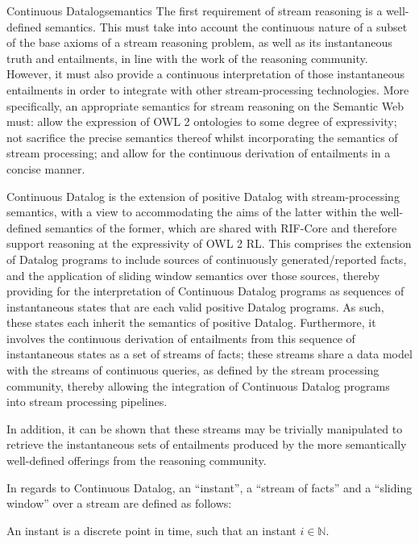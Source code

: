 \begin{nestedsection}{Continuous Datalog}{semantics}
The first requirement of stream reasoning is a well-defined semantics.
This must take into account the continuous nature of a subset of the
base axioms of a stream reasoning problem, as well as its
instantaneous truth and entailments, in line with the work of the
reasoning community.  However, it must also provide a continuous
interpretation of those instantaneous entailments in order to
integrate with other stream-processing technologies.  More
specifically, an appropriate semantics for stream reasoning on the
Semantic Web must: allow the expression of OWL 2 ontologies to some
degree of expressivity; not sacrifice the precise semantics thereof
whilst incorporating the semantics of stream processing; and allow for
the continuous derivation of entailments in a concise manner.

	Continuous Datalog is the extension of positive Datalog with stream-processing semantics, with a view to accommodating the aims of the latter within the well-defined semantics of the former, which are shared with RIF-Core and therefore support reasoning at the expressivity of OWL 2 RL.
	This comprises the extension of Datalog programs to include sources of continuously generated/reported facts, and the application of sliding window semantics over those sources, thereby providing for the interpretation of Continuous Datalog programs as sequences of instantaneous states that are each valid positive Datalog programs.
	As such, these states each inherit the semantics of positive Datalog.
	Furthermore, it involves the continuous derivation of entailments from this sequence of instantaneous states as a set of streams of facts;
	these streams share a data model with the streams of continuous queries, as defined by the stream processing community, thereby allowing the integration of Continuous Datalog programs into stream processing pipelines.

In addition, it can be shown that these streams may be trivially
manipulated to retrieve the instantaneous sets of entailments produced
by the more semantically well-defined offerings from the reasoning
community.

	In regards to Continuous Datalog, an ``instant'', a ``stream of facts'' and a ``sliding window'' over a stream are defined as follows:

\begin{definition}[Instant]\label{def:continuous datalog: instant}
An instant is a discrete point in time, such that an instant ${i \in \mathbb{N}}$.


\end{definition}
\end{nestedsection}
